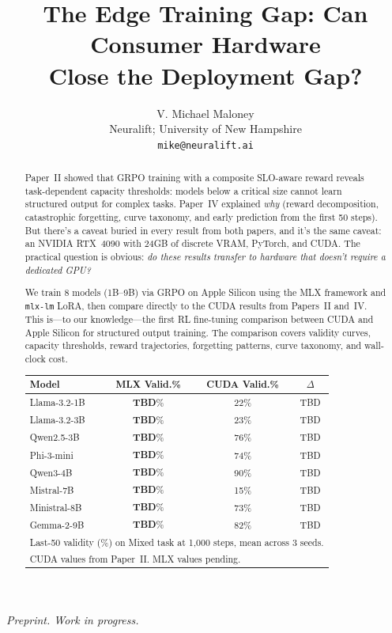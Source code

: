 \documentclass[11pt]{article}
\title{The Edge Training Gap: Can Consumer Hardware\\Close the Deployment Gap?}
\author{
V. Michael Maloney \\
Neuralift; University of New Hampshire \\
\texttt{mike@neuralift.ai}
}
\date{}
\begin{document}
\maketitle
\begin{center}
\textit{Preprint.  Work in progress.}
\end{center}

\begin{abstract}
Paper~II showed that GRPO training with a composite SLO-aware reward reveals task-dependent capacity thresholds: models below a critical size cannot learn structured output for complex tasks.  Paper~IV explained \emph{why} (reward decomposition, catastrophic forgetting, curve taxonomy, and early prediction from the first 50 steps).  But there's a caveat buried in every result from both papers, and it's the same caveat: an NVIDIA RTX~4090 with 24GB of discrete VRAM, PyTorch, and CUDA.  The practical question is obvious: \emph{do these results transfer to hardware that doesn't require a dedicated GPU?}

We train 8 models (1B--9B) via GRPO on Apple Silicon using the MLX framework and \texttt{mlx-lm} LoRA, then compare directly to the CUDA results from Papers~II and~IV.  This is---to our knowledge---the first RL fine-tuning comparison between CUDA and Apple Silicon for structured output training.  The comparison covers validity curves, capacity thresholds, reward trajectories, forgetting patterns, curve taxonomy, and wall-clock cost.

\begin{center}
\small
\begin{tabular}{lcc c}
\toprule
\textbf{Model} & \textbf{MLX Valid.\%} & \textbf{CUDA Valid.\%} & \textbf{$\Delta$} \\
\midrule
Llama-3.2-1B  & \textbf{TBD}\% & 22\% & TBD \\
Llama-3.2-3B  & \textbf{TBD}\% & 23\% & TBD \\
Qwen2.5-3B    & \textbf{TBD}\% & 76\% & TBD \\
Phi-3-mini     & \textbf{TBD}\% & 74\% & TBD \\
Qwen3-4B       & \textbf{TBD}\% & 90\% & TBD \\
Mistral-7B     & \textbf{TBD}\% & 15\% & TBD \\
Ministral-8B   & \textbf{TBD}\% & 73\% & TBD \\
Gemma-2-9B     & \textbf{TBD}\% & 82\% & TBD \\
\bottomrule
\multicolumn{4}{l}{\footnotesize Last-50 validity (\%) on Mixed task at 1{,}000 steps, mean across 3 seeds.} \\
\multicolumn{4}{l}{\footnotesize CUDA values from Paper~II. MLX values pending.}
\end{tabular}
\end{center}


\end{abstract}
\end{document}
